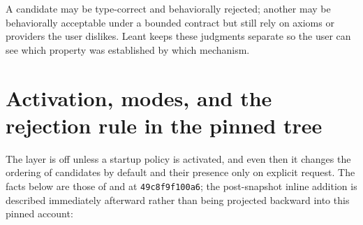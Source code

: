 \documentclass[10pt,letterpaper,oneside,openany]{report}
\newcommand{\LeantCommit}{\texttt{49c8f9f100a6}}
\begin{document}
\begin{keyidea}
A candidate may be type-correct and behaviorally rejected; another may be behaviorally acceptable under a bounded contract but still rely on axioms or providers the user dislikes.  Leant keeps these judgments separate so the user can see which property was established by which mechanism.
\end{keyidea}
\section{Activation, modes, and the rejection rule in the pinned tree}

The layer is off unless a startup policy is activated, and even then it changes the ordering of candidates by default and their presence only on explicit request.  The facts below are those of  and  at \LeantCommit; the post-snapshot inline addition is described immediately afterward rather than being projected backward into this pinned account:
\end{document}
